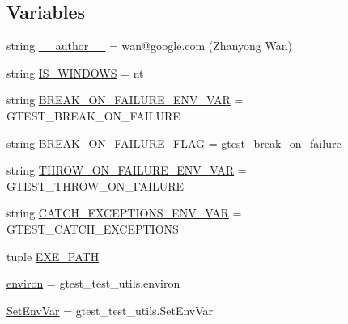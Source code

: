 \subsection*{Variables}
\begin{DoxyCompactItemize}
\item 
string \hyperlink{namespacegtest__break__on__failure__unittest_a3d6a5c600af8e8c6a21407bc2042b38a}{\+\_\+\+\_\+author\+\_\+\+\_\+} = \textquotesingle{}wan@google.\+com (Zhanyong Wan)\textquotesingle{}
\item 
string \hyperlink{namespacegtest__break__on__failure__unittest_aec67fcd1a946db2d8c747f6519a5bb05}{I\+S\+\_\+\+W\+I\+N\+D\+O\+W\+S} = \textquotesingle{}nt\textquotesingle{}
\item 
string \hyperlink{namespacegtest__break__on__failure__unittest_a95b56c611c5844be4247700787a175a1}{B\+R\+E\+A\+K\+\_\+\+O\+N\+\_\+\+F\+A\+I\+L\+U\+R\+E\+\_\+\+E\+N\+V\+\_\+\+V\+A\+R} = \textquotesingle{}G\+T\+E\+S\+T\+\_\+\+B\+R\+E\+A\+K\+\_\+\+O\+N\+\_\+\+F\+A\+I\+L\+U\+R\+E\textquotesingle{}
\item 
string \hyperlink{namespacegtest__break__on__failure__unittest_a04adcb60898d929007033e178c772e88}{B\+R\+E\+A\+K\+\_\+\+O\+N\+\_\+\+F\+A\+I\+L\+U\+R\+E\+\_\+\+F\+L\+A\+G} = \textquotesingle{}gtest\+\_\+break\+\_\+on\+\_\+failure\textquotesingle{}
\item 
string \hyperlink{namespacegtest__break__on__failure__unittest_ac5edd000e7dc4212c8c7ce947ebd3b72}{T\+H\+R\+O\+W\+\_\+\+O\+N\+\_\+\+F\+A\+I\+L\+U\+R\+E\+\_\+\+E\+N\+V\+\_\+\+V\+A\+R} = \textquotesingle{}G\+T\+E\+S\+T\+\_\+\+T\+H\+R\+O\+W\+\_\+\+O\+N\+\_\+\+F\+A\+I\+L\+U\+R\+E\textquotesingle{}
\item 
string \hyperlink{namespacegtest__break__on__failure__unittest_a0c1cd8079b97c6924156075c6c9733c3}{C\+A\+T\+C\+H\+\_\+\+E\+X\+C\+E\+P\+T\+I\+O\+N\+S\+\_\+\+E\+N\+V\+\_\+\+V\+A\+R} = \textquotesingle{}G\+T\+E\+S\+T\+\_\+\+C\+A\+T\+C\+H\+\_\+\+E\+X\+C\+E\+P\+T\+I\+O\+N\+S\textquotesingle{}
\item 
tuple \hyperlink{namespacegtest__break__on__failure__unittest_aa546748fb3f26cc797f240387333fc3a}{E\+X\+E\+\_\+\+P\+A\+T\+H}
\item 
\hyperlink{namespacegtest__break__on__failure__unittest_a6d74240e4ea26e0a68e1025f9b8c878d}{environ} = gtest\+\_\+test\+\_\+utils.\+environ
\item 
\hyperlink{namespacegtest__break__on__failure__unittest_a6d10069714f75f3f755c1d2c9c0ddd15}{Set\+Env\+Var} = gtest\+\_\+test\+\_\+utils.\+Set\+Env\+Var
\end{DoxyCompactItemize}


